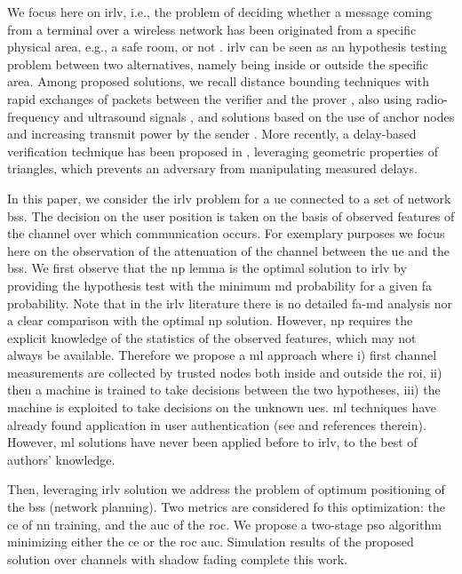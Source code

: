 \documentclass[conference,draftcls,onecolumn]{IEEEtran}
\begin{document}
We focus here on  \ac{irlv}, i.e., the problem of deciding whether a message coming from a terminal over a wireless network has been originated from a specific physical area, e.g., a safe room, or not \cite{Zeng-survey}. \ac{irlv} can be seen as an hypothesis testing problem between two alternatives, namely being inside or outside the specific area. Among proposed solutions, we recall distance bounding techniques with rapid exchanges of packets between the verifier and the prover \cite{Brands}, also using radio-frequency and ultrasound signals \cite{Sastry}, and solutions based on the use of anchor nodes and increasing transmit power by the sender \cite{Vora}. More recently, a delay-based verification technique has been proposed  in \cite{7145434}, leveraging geometric properties of triangles, which prevents an adversary from manipulating measured delays. 

In this paper, we consider the \ac{irlv} problem for a \ac{ue} connected to a set of network \acp{bs}. The decision on the user position is taken on the basis of observed features of the channel over which communication occurs. For exemplary purposes we focus here on the observation of the attenuation of the channel between the \ac{ue} and the \acp{bs}. We first observe that the  \ac{np} lemma \cite{Neyman289} is the optimal solution to \ac{irlv} by providing the hypothesis test with the minimum \ac{md} probability for a given \ac{fa} probability.
Note that in the \ac{irlv} literature there is no detailed \ac{fa}-\ac{md} analysis nor a clear comparison with the optimal \ac{np} solution.
 However, \ac{np}  requires the explicit knowledge of the statistics of the observed features, which may not always be available. Therefore we propose a \ac{ml} approach  where i) first channel measurements are collected by trusted nodes both inside and outside the \ac{roi}, ii) then a machine is trained to take decisions between the two hypotheses, iii) the machine is exploited to take decisions on the unknown \acp{ue}. \ac{ml} techniques have already found application in user authentication (see  \cite{xiao-2018} and references therein). However, \ac{ml} solutions have never been applied before to \ac{irlv}, to the best of authors' knowledge. 

Then, leveraging \ac{irlv} solution we address the problem of optimum positioning of the \acp{bs} (network planning). Two metrics are considered fo this optimization: the \ac{ce} of \ac{nn} training, and the \ac{auc} of the \ac{roc}. We propose a two-stage \ac{pso} algorithm minimizing either the \ac{ce} or the \ac{roc} \ac{auc}. Simulation results of the proposed solution over channels with shadow fading complete this work.
\end{document}
